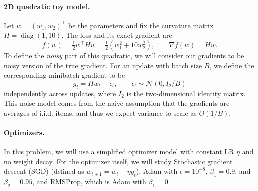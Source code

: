 \paragraph{2D quadratic toy model.}
Let $w=(w_1,w_2)^\top$ be the parameters and fix the curvature matrix
$H=\operatorname{diag}(1,10)$. The loss and its exact gradient are
\[
 f(w)=\tfrac12 w^\top H w=\tfrac12(w_1^2+10w_2^2),
 \qquad \nabla f(w)=Hw.
\]
To define the \emph{noisy} part of this quadratic, we will consider our gradients to be noisy version of the true gradient. For an update with batch size $B$, we define the corresponding minibatch gradient to be
\[
 g_t=Hw_t+\epsilon_t,\qquad
 \epsilon_t\sim\mathcal N(0,I_2/B)
\]
independently across updates, where $I_2$ is the two-dimensional identity matrix. This noise model comes from the naive assumption that the gradients are averages of i.i.d. items, and thus we expect variance to scale as $O(1/B)$.

\paragraph{Optimizers.}
In this problem, we will use a simplified optimizer model with constant LR $\eta$ and no weight decay. For the optimizer itself, we will study Stochastic gradient descent (SGD)  (defined as $w_{t+1}=w_t-\eta g_t$), Adam with $\epsilon=10^{-8}$, $\beta_{1}=0.9$, and $\beta_{2}=0.95$, and RMSProp, which is Adam with $\beta_{1}=0$.


